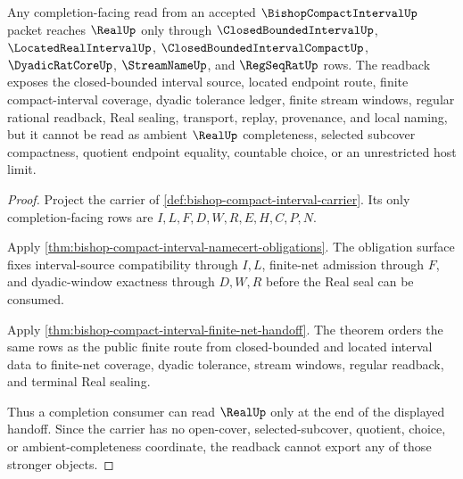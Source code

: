 \begin{theorem}
\label{thm:bishop-compact-interval-completion-readback}
Any completion-facing read from an accepted $\BishopCompactIntervalUp$ packet reaches $\RealUp$ only through $\ClosedBoundedIntervalUp$, $\LocatedRealIntervalUp$, $\ClosedBoundedIntervalCompactUp$, $\DyadicRatCoreUp$, $\StreamNameUp$, and $\RegSeqRatUp$ rows. The readback exposes the closed-bounded interval source, located endpoint route, finite compact-interval coverage, dyadic tolerance ledger, finite stream windows, regular rational readback, Real sealing, transport, replay, provenance, and local naming, but it cannot be read as ambient $\RealUp$ completeness, selected subcover compactness, quotient endpoint equality, countable choice, or an unrestricted host limit.
\end{theorem}
\begin{proof}
Project the carrier of \autoref{def:bishop-compact-interval-carrier}. Its only completion-facing rows are $I,L,F,D,W,R,E,H,C,P,N$.

Apply \autoref{thm:bishop-compact-interval-namecert-obligations}. The obligation surface fixes interval-source compatibility through $I,L$, finite-net admission through $F$, and dyadic-window exactness through $D,W,R$ before the Real seal can be consumed.

Apply \autoref{thm:bishop-compact-interval-finite-net-handoff}. The theorem orders the same rows as the public finite route from closed-bounded and located interval data to finite-net coverage, dyadic tolerance, stream windows, regular readback, and terminal Real sealing.

Thus a completion consumer can read $\RealUp$ only at the end of the displayed handoff. Since the carrier has no open-cover, selected-subcover, quotient, choice, or ambient-completeness coordinate, the readback cannot export any of those stronger objects.
\end{proof}



